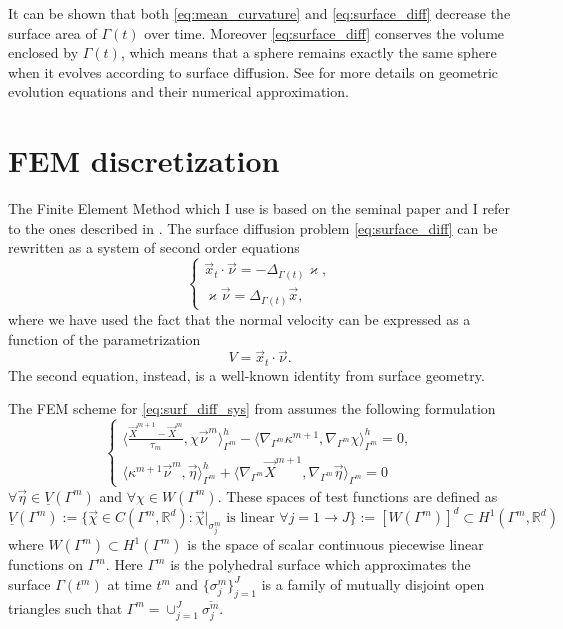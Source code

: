 It can be shown that both \eqref{eq:mean_curvature} and
\eqref{eq:surface_diff} decrease the surface area of $\Gamma(t)$ over time.
Moreover \eqref{eq:surface_diff} conserves the volume enclosed by $\Gamma(t)$,
which means that a sphere remains exactly the same sphere when it evolves
according to surface diffusion. See \cite{DeckelnickDE05} for more details on
geometric evolution equations and their numerical approximation.

\section[FEM discretization]{FEM discretization}
The Finite Element Method which I use is based on the seminal paper
\cite{Dziuk91} and I refer to the ones described in
\cite{triplej,triplejMC,gflows3d}. The surface diffusion problem
\eqref{eq:surface_diff} can be rewritten as a system of second order equations
\begin{equation}\label{eq:surf_diff_sys}
 \begin{cases}
  \vec{x}_t\cdot\vec{\nu}=-\Delta_{\Gamma(t)} \varkappa,\\
  \varkappa\vec{\nu}=\Delta_{\Gamma(t)}\vec{x},
 \end{cases}
\end{equation}
where we have used the fact that the normal velocity can be expressed as a
function of the parametrization
\begin{equation}
 V=\vec{x}_t\cdot\vec{\nu}.
\end{equation}
The second equation, instead, is a well-known identity from surface geometry.

The FEM scheme for \eqref{eq:surf_diff_sys} from \cite{gflows3d} assumes the
following formulation
\begin{equation}\label{eq:fem_surf_diff}
 \begin{cases}
  \langle \frac{\vec{X}^{m + 1} - \vec{X}^{m}}{\tau_m},
  \chi\vec{\nu}^m\rangle_{\Gamma^m}^{h} - \langle\nabla_{
  \Gamma^m}\kappa^{m+1}, \nabla_{\Gamma^m}\chi \rangle_{\Gamma^m}^{h} = 0,\\
  \langle\kappa^{m+1}\vec{\nu}^m,
  \vec{\eta}\rangle_{\Gamma^m}^{h} + \langle\nabla_{\Gamma^m}\vec{X}^{m + 1},
  \nabla_{\Gamma^m}\vec{\eta} \rangle_{\Gamma^m}=0
 \end{cases}
\end{equation}
$\forall\vec{\eta}\in\underline{V}(\Gamma^m)$ and $\forall\chi\in W(\Gamma^m)$.
These spaces of test functions are defined as
\begin{equation}\label{eq:space_test_functions}
 \underline{V}(\Gamma^m) := \{\vec{\chi}\in C(\Gamma^m,\mathbb{R}^d) :
\vec{\chi}|_{\sigma_j^m}\textrm{ is linear }\forall j=1\rightarrow J\} :=
[W(\Gamma^m)]^d\subset H^1(\Gamma^m,\mathbb{R}^d)
\end{equation}
where $W(\Gamma^m)\subset H^1(\Gamma^m)$ is the space of scalar continuous
piecewise linear functions on $\Gamma^m$. Here $\Gamma^m$ is the polyhedral
surface which approximates the surface $\Gamma (t^m)$ at time $t^m$ and
$\{\sigma_j^m\}_{j=1}^J$ is a family of mutually disjoint open triangles such
that $\Gamma^m=\cup_{j=1}^J\overline{\sigma_j^m}$.

